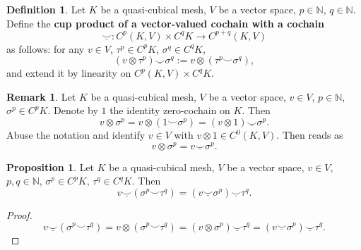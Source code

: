 \documentclass[fleqn]{article}
\theoremstyle{definition}
\newtheorem{proposition}[theorem]{Proposition}
\newtheorem{definition}[theorem]{Definition}
\newtheorem{remark}[theorem]{Remark}
\newcommand{\N}{\mathbb{N}}
\newcommand{\usmile}{\underline{\smile}}
\begin{document}
\begin{definition}
  Let
    $K$ be a quasi-cubical mesh,
    $V$ be a vector space,
    $p \in \N$,
    $q \in \N$.
  Define the \textbf{cup product of a vector-valued cochain with a cochain}
  \begin{equation}
    \usmile \colon C^p(K, V) \times C^q K \to C^{p + q}(K, V)
  \end{equation}
  as follows: for any $v \in V$, $\tau^p \in C^p K$, $\sigma^q \in C^q K$,
  \begin{equation}
    (v \otimes \tau^p) \usmile \sigma^q := v \otimes (\tau^p \smile \sigma^q),
  \end{equation}
  and extend it by linearity on $C^p(K, V) \times C^q K$.
\end{definition}

\begin{remark}
  Let
    $K$ be a quasi-cubical mesh,
    $V$ be a vector space,
    $v \in V$,
    $p \in \N$,
    $\sigma^p \in C^p K$.
  Denote by $1$ the identity zero-cochain on $K$.
  Then
  \begin{equation}
  \label{idec:tensor_to_cup:equation}
    v \otimes \sigma^p
    = v \otimes (1 \smile \sigma^p)
    = (v \otimes 1) \usmile \sigma^p.
  \end{equation}
  Abuse the notation and identify $v \in V$ with $v \otimes 1 \in C^0(K, V)$.
  Then  reads as
  \begin{equation}
    v \otimes \sigma^p = v \usmile \sigma^p.
  \end{equation}
\end{remark}

\begin{proposition}
  Let
    $K$ be a quasi-cubical mesh,
    $V$ be a vector space, $v \in V$,
    $p, q \in \N$,
    $\sigma^p \in C^p K$,
    $\tau^q \in C^q K$.
  Then
  \begin{equation}
    v \usmile (\sigma^p \smile \tau^q) = (v \usmile \sigma^p) \usmile \tau^q.
  \end{equation}
\end{proposition}

\begin{proof}
  \begin{equation}
    v \usmile (\sigma^p \smile \tau^q)
    = v \otimes (\sigma^p \smile \tau^q)
    = (v \otimes \sigma^p) \usmile \tau^q
    = (v \usmile \sigma^p) \usmile \tau^q.
  \end{equation}
\end{proof}
\end{document}
